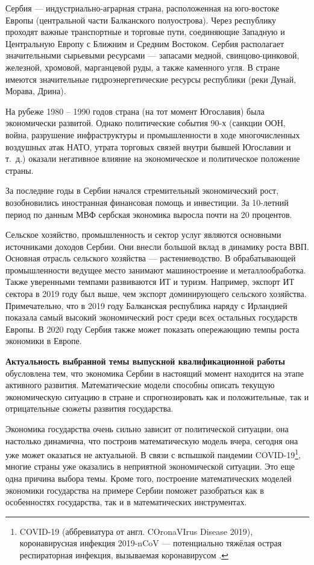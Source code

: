\Introduction

Сербия --- индустриально-аграрная страна, расположенная на юго-востоке Европы (центральной части Балканского полуострова).
Через республику проходят важные транспортные и торговые пути, соединяющие Западную и Центральную Европу с Ближним и Средним Востоком.
Сербия располагает значительными сырьевыми ресурсами --- запасами медной, свинцово-цинковой, железной, хромовой, марганцевой руды, а также каменного угля.
В стране имеются значительные гидроэнергетические ресурсы республики (реки Дунай, Морава, Дрина).

На рубеже 1980 -- 1990 годов страна (на тот момент Югославия) была экономически развитой.
Однако политические события 90-х (санкции ООН, война, разрушение инфраструктуры и промышленности в ходе многочисленных воздушных атак НАТО, утрата торговых связей внутри бывшей Югославии и т.~д.) оказали негативное влияние на экономическое и политическое положение страны.

За последние годы в Сербии начался стремительный экономический рост, возобновились иностранная финансовая помощь и инвестиции.
За 10-летний период по данным МВФ сербская экономика выросла почти на 20 процентов.

Сельское хозяйство, промышленность и сектор услуг являются основными источниками доходов Сербии.
Они внесли большой вклад в динамику роста ВВП.
Основная отрасль сельского хозяйства --- растениеводство.
В обрабатывающей промышленности ведущее место занимают машиностроение и металлообработка.
Также уверенными темпами развиваются ИТ и туризм.
Например, экспорт ИТ сектора в 2019 году был выше, чем экспорт доминирующего сельского хозяйства.
Примечательно, что в 2019 году Балканская республика наряду с Ирландией показала самый высокий экономический рост среди всех остальных государств Европы.
В 2020 году Сербия также может показать опережающию темпы роста экономики в Европе.

\textbf{Актуальность выбранной темы выпускной квалификационной работы } обусловлена тем, что экономика Сербии в настоящий момент находится на этапе активного развития.
Математические модели способны описать текущую экономическую ситуацию в стране и спрогнозировать как и положительные, так и отрицательные сюжеты развития государства.

Экономика государства очень сильно зависит от политической ситуации, она настолько динамична, что построив математическую модель вчера, сегодня она уже может оказаться не актуальной. В связи с вспышкой пандемии COVID-19\footnote{COVID-19 (аббревиатура от англ. COronaVIrus Disease 2019), коронавирусная инфекция 2019-nCoV --- потенциально тяжёлая острая респираторная инфекция, вызываемая коронавирусом \cite{wiki:Coronavirus_disease_2019}.}, многие страны уже оказались в неприятной экономической ситуации.
Это еще одна причина выбора темы.
Кроме того, построение математических моделей экономики государства на примере Сербии поможет разобраться как в особенностях государства, так и в математических инструментах.

